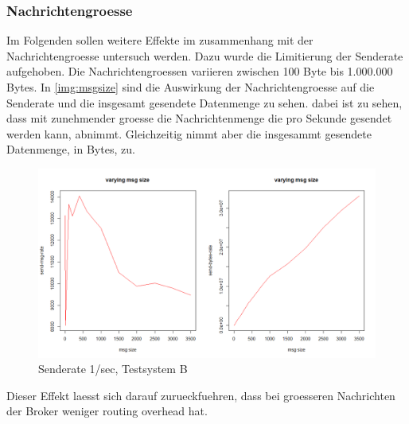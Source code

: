 \subsubsection{Nachrichtengroesse}
Im Folgenden sollen weitere Effekte im zusammenhang mit der Nachrichtengroesse untersuch werden. Dazu wurde die Limitierung der Senderate aufgehoben. Die Nachrichtengroessen variieren zwischen 100 Byte bis 1.000.000 Bytes.
In \autoref{img:msgsize} sind die Auswirkung der Nachrichtengroesse auf die Senderate und die insgesamt gesendete Datenmenge zu sehen. dabei ist zu sehen, dass mit zunehmender groesse die Nachrichtenmenge die pro Sekunde gesendet werden kann, abnimmt. Gleichzeitig nimmt aber die insgesammt gesendete Datenmenge, in Bytes, zu. 
\begin{figure}
\center
  \includegraphics[width=1\textwidth]{images/msg-size.png}
  \caption{Senderate 1/sec, Testsystem B}
  \label{img:msgsize}
\end{figure}
Dieser Effekt laesst sich darauf zurueckfuehren, dass bei groesseren Nachrichten der Broker weniger routing overhead hat.

